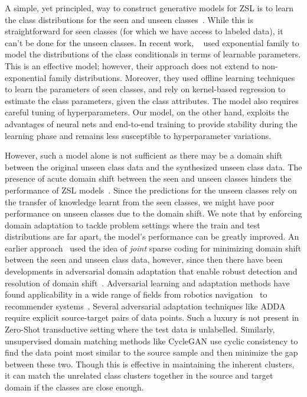 \documentclass[10pt,twocolumn,letterpaper]{article}
\begin{document}
 A simple, yet principled, way to construct generative models for ZSL is to learn the class distributions for the seen and unseen classes~\cite{verma2017simple,wang2017zero}. While this is straightforward for seen classes (for which we have access to labeled data), it can't be done for the unseen classes. In recent work, ~\cite{verma2017simple} used exponential family to model the distributions of the class conditionals in terms of learnable parameters. This is an effective model; however, their approach does not extend to non-exponential family distributions. Moreover, they used offline learning techniques to learn the parameters of seen classes, and rely on kernel-based regression to estimate the class parameters, given the class attributes. The model also requires careful tuning of hyperparameters. Our model, on the other hand, exploits the advantages of neural nets and end-to-end training to provide stability during the learning phase and remains less susceptible to hyperparameter variations.
 
However, such a model alone is not sufficient as there may be a domain shift between the original unseen class data and the synthesized unseen class data. The presence of acute domain shift between the seen and unseen classes hinders the performance of ZSL models~\cite{UDA}. Since the predictions for the unseen classes rely on the transfer of knowledge learnt from the seen classes, we might have poor performance on unseen classes due to the domain shift. We note that by enforcing domain adaptation to tackle problem settings where the train and test distributions are far apart, the model's performance can be greatly improved. An earlier approach~\cite{UDA} used the idea of \emph{joint} sparse coding for minimizing domain shift between the seen and unseen class data, however, since then there have been developments in adversarial domain adaptation that enable robust detection and resolution of domain shift~\cite{adda,cycada}. Adversarial learning and adaptation methods have found applicability in a wide range of fields from robotics navigation~\cite{icra} to recommender systems~\cite{recgan,irgan}. Several adversarial adaptation techniques like ADDA\cite{adda} require explicit source-target pairs of data points. Such a luxury is not present in Zero-Shot transductive setting where the test data is unlabelled. Similarly, unsupervised domain matching methods like CycleGAN\cite{cyclegan} use cyclic consistency to find the data point most similar to the source sample and then minimize the gap between these two. Though this is effective in maintaining the inherent clusters, it can match the unrelated class clusters together in the source and target domain if the classes are close enough.
\end{document}
